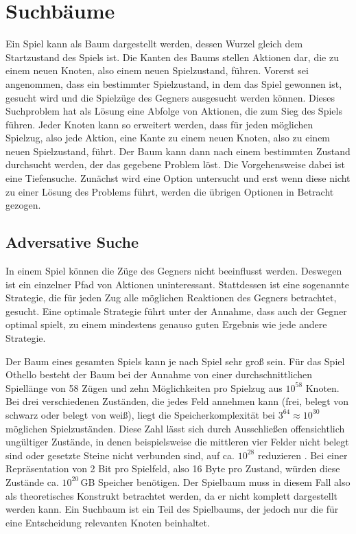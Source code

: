 \section{Suchbäume}
\label{sec:gametree}

Ein Spiel kann als Baum dargestellt werden, dessen Wurzel gleich dem Startzustand des Spiels ist. Die Kanten des Baums
stellen Aktionen dar, die zu einem neuen Knoten, also einem neuen Spielzustand, führen. Vorerst sei angenommen, dass ein
bestimmter Spielzustand, in dem das Spiel gewonnen ist, gesucht wird und die Spielzüge des Gegners ausgesucht werden
können. Dieses Suchproblem hat als Lösung eine Abfolge von Aktionen, die zum Sieg des Spiels führen. Jeder Knoten kann
so erweitert werden, dass für jeden möglichen Spielzug, also jede Aktion, eine Kante zu einem neuen Knoten, also zu
einem neuen Spielzustand, führt. Der Baum kann dann nach einem bestimmten Zustand durchsucht werden, der das gegebene
Problem löst. Die Vorgehensweise dabei ist eine Tiefensuche. Zunächst wird eine Option untersucht und erst wenn diese
nicht zu einer Lösung des Problems führt, werden die übrigen Optionen in Betracht gezogen.
\cite[S.~75]{ai2010russel}

\subsection{Adversative Suche}
In einem Spiel können die Züge des Gegners nicht beeinflusst werden. Deswegen ist ein einzelner Pfad von Aktionen
uninteressant. Stattdessen ist eine sogenannte Strategie, die für jeden Zug alle möglichen Reaktionen des Gegners betrachtet,
gesucht. Eine optimale Strategie führt unter der Annahme, dass auch der Gegner optimal spielt, zu einem mindestens
genauso guten Ergebnis wie jede andere Strategie.
\cite[S.~163f.]{ai2010russel}

Der Baum eines gesamten Spiels kann je nach Spiel sehr groß sein. Für das Spiel Othello besteht der Baum bei der Annahme
von einer durchschnittlichen Spiellänge von 58 Zügen und zehn Möglichkeiten pro Spielzug aus $10^{58}$ Knoten. Bei drei
verschiedenen Zuständen, die jedes Feld annehmen kann (frei, belegt von schwarz oder belegt von weiß), liegt die
Speicherkomplexität bei $3^{64}\approx10^{30}$ möglichen Spielzuständen. Diese Zahl lässt sich durch Ausschließen
offensichtlich ungültiger Zustände, in denen beispielsweise die mittleren vier Felder nicht belegt sind oder gesetzte
Steine nicht verbunden sind, auf ca. $10^{28}$ reduzieren \cite[S.~167]{searchingforsolutions}.
Bei einer Repräsentation von 2 Bit pro Spielfeld, also 16 Byte pro Zustand, würden diese Zustände ca. $10^{20}$\,GB
Speicher benötigen. Der Spielbaum muss in diesem Fall also als theoretisches Konstrukt betrachtet werden, da er nicht
komplett dargestellt werden kann. Ein Suchbaum ist ein Teil des Spielbaums, der jedoch nur die für eine Entscheidung
relevanten Knoten beinhaltet.
\cite[S.~162f.]{ai2010russel}

